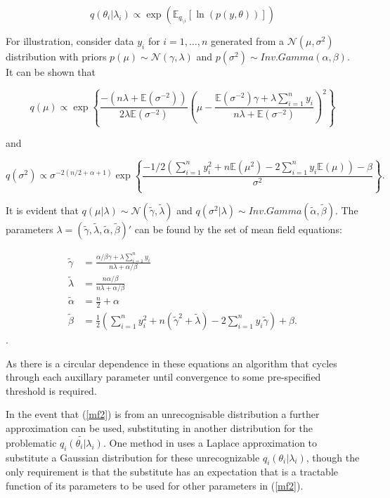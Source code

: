 \documentclass[12pt,a4paper]{article}%
\numberwithin{equation}{section}
\begin{document}
\begin{equation}
\label{mf2}
q(\theta_i | \lambda_i) \propto\exp( \mathbb{E}_{q_{\setminus i}} [\ln(p(y,\theta))])
\end{equation}

For illustration, consider data $y_i$ for $i = 1, \dots, n$ generated from a $\mathcal{N}(\mu, \sigma^2)$ distribution with priors $p(\mu) \sim \mathcal{N}(\gamma, \lambda)$ and $p(\sigma^2) \sim Inv.Gamma(\alpha, \beta)$. It can be shown that

\begin{equation}
\label{mf3}
q(\mu) \propto \exp \left\{ \frac{-(n\lambda + \mathbb{E}(\sigma^{-2}))}{2\lambda\mathbb{E}(\sigma^{-2})} \left( \mu - \frac{\mathbb{E}(\sigma^{-2})\gamma + \lambda \sum_{i=1}^{n} y_i}{n \lambda + \mathbb{E}(\sigma^{-2})} \right)^2 \right\}
\end{equation}

and

\begin{equation}
\label{mf4}
q(\sigma^2) \propto \sigma^{-2(n/2 + \alpha + 1)} \exp \left\{ \frac{ -1/2(\sum_{i=1}^{n}y_i^2 + n\mathbb{E}(\mu^2) - 2\sum_{i=1}^{n} y_i \mathbb{E}(\mu)) - \beta}{\sigma^2} \right\}.
\end{equation}

It is evident that $q(\mu | \lambda) \sim \mathcal{N}(\tilde{\gamma}, \tilde{\lambda})$ and $q(\sigma^2 | \lambda) \sim Inv.Gamma(\tilde{\alpha}, \tilde{\beta})$. The parameters $\lambda = (\tilde{\gamma}, \tilde{\lambda}, \tilde{\alpha}, \tilde{\beta})'$ can be found by the set of mean field equations:

\begin{align}
\tilde{\gamma} &= \frac{\alpha / \beta \gamma + \lambda \sum_{i=1}^{n} y_i} {n \lambda + \alpha / \beta} \label{mf5} \\ 
\tilde{\lambda} &= \frac{n \alpha / \beta}{n \lambda + \alpha / \beta} \\
\tilde{\alpha} &= \frac{n}{2} + \alpha \\
\tilde{\beta} &= \frac{1}{2} \left(\sum_{i=1}^{n} y_i^2 + n(\tilde{\gamma}^2 + \tilde{\lambda}) - 2 \sum_{i=1}^{n} y_i \tilde{\gamma} \right) + \beta. \label{mf6}
\end{align}.

As there is a circular dependence in these equations an algorithm that cycles through each auxillary parameter until convergence to some pre-specified threshold is required.

In the event that (\ref{mf2}) is from an unrecognisable distribution a further approximation can be used, substituting in another distribution for the problematic $\tilde{q_i(\theta_i|\lambda_i)}.$ One method in \citet{Friston2006} uses a Laplace approximation to substitute a Gaussian distribution for these unrecognizable $q_i(\theta_i | \lambda_i)$, though the only requirement is that the substitute has an expectation that is a tractable function of its parameters to be used for other parameters in (\ref{mf2}). 
\end{document}

